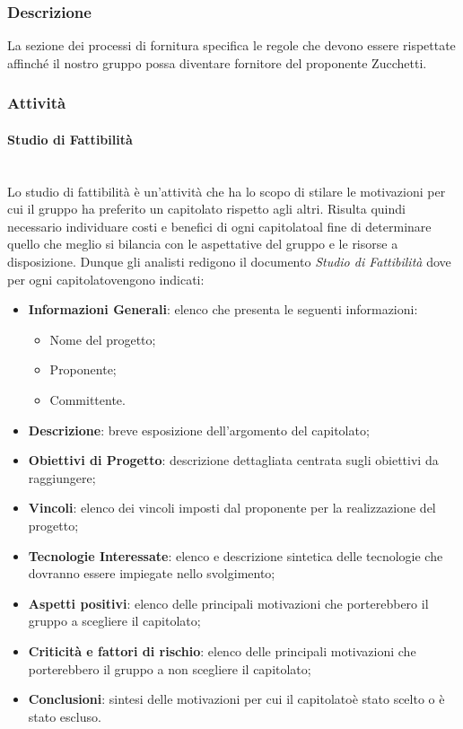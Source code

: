 \subsubsection{Descrizione}
La sezione dei processi di fornitura specifica le regole che devono essere rispettate affinché il nostro gruppo possa diventare fornitore del proponente Zucchetti.
\subsubsection{Attività}
\paragraph{Studio di Fattibilità}\mbox{}\\ [1mm]
Lo studio di fattibilità è un'attività che ha lo scopo di stilare le motivazioni per cui il gruppo ha preferito un capitolato rispetto agli altri.
Risulta quindi necessario individuare costi e benefici di ogni capitolato\glosp al fine di determinare quello che meglio si bilancia con le aspettative del gruppo e le risorse a disposizione.
Dunque gli analisti redigono il documento \textit{Studio di Fattibilità} dove per ogni capitolato\glosp vengono indicati:
\begin{itemize}
	\item \textbf{Informazioni Generali}: elenco che presenta le seguenti informazioni: 
	\begin{itemize}
		\item Nome del progetto;
		\item Proponente;
		\item Committente.
	\end{itemize} 
	\item \textbf{Descrizione}: breve esposizione dell'argomento del capitolato\glo;
	\item \textbf{Obiettivi di Progetto}: descrizione dettagliata centrata sugli obiettivi da raggiungere;
	\item \textbf{Vincoli}: elenco dei vincoli imposti dal proponente per la realizzazione del progetto;
	\item \textbf{Tecnologie Interessate}: elenco e descrizione sintetica delle tecnologie che dovranno essere impiegate nello svolgimento;
	\item \textbf{Aspetti positivi}: elenco delle principali motivazioni che porterebbero il gruppo a scegliere il capitolato\glo;
	\item \textbf{Criticità e fattori di rischio}: elenco delle principali motivazioni che porterebbero il gruppo a non scegliere il capitolato\glo;
	\item \textbf{Conclusioni}: sintesi delle motivazioni per cui il capitolato\glosp è stato scelto o è stato escluso.
\end{itemize}
